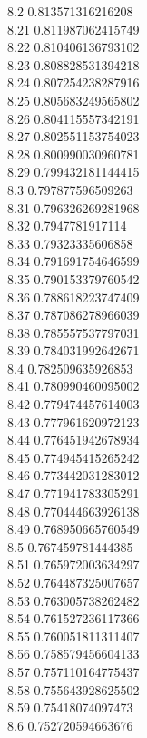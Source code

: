 {8.2	0.813571316216208\\
8.21	0.811987062415749\\
8.22	0.810406136793102\\
8.23	0.808828531394218\\
8.24	0.807254238287916\\
8.25	0.805683249565802\\
8.26	0.804115557342191\\
8.27	0.802551153754023\\
8.28	0.800990030960781\\
8.29	0.799432181144415\\
8.3	0.797877596509263\\
8.31	0.796326269281968\\
8.32	0.7947781917114\\
8.33	0.79323335606858\\
8.34	0.791691754646599\\
8.35	0.790153379760542\\
8.36	0.788618223747409\\
8.37	0.787086278966039\\
8.38	0.785557537797031\\
8.39	0.784031992642671\\
8.4	0.782509635926853\\
8.41	0.780990460095002\\
8.42	0.779474457614003\\
8.43	0.777961620972123\\
8.44	0.776451942678934\\
8.45	0.774945415265242\\
8.46	0.773442031283012\\
8.47	0.771941783305291\\
8.48	0.770444663926138\\
8.49	0.768950665760549\\
8.5	0.767459781444385\\
8.51	0.765972003634297\\
8.52	0.764487325007657\\
8.53	0.763005738262482\\
8.54	0.761527236117366\\
8.55	0.760051811311407\\
8.56	0.758579456604133\\
8.57	0.757110164775437\\
8.58	0.755643928625502\\
8.59	0.75418074097473\\
8.6	0.752720594663676\\
}
